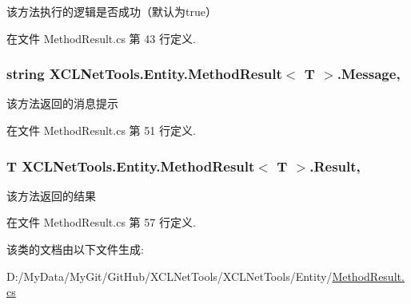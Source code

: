 该方法执行的逻辑是否成功（默认为true） 



在文件 Method\-Result.\-cs 第 43 行定义.

\hypertarget{class_x_c_l_net_tools_1_1_entity_1_1_method_result_3_01_t_01_4_a94580e5529a2d7f2cfce40060475c86d}{
\subsubsection[{Message}]{\setlength{\rightskip}{0pt plus 5cm}string X\-C\-L\-Net\-Tools.\-Entity.\-Method\-Result$<$ T $>$.Message\hspace{0.3cm}{\ttfamily [get]}, {\ttfamily [set]}}}\label{class_x_c_l_net_tools_1_1_entity_1_1_method_result_3_01_t_01_4_a94580e5529a2d7f2cfce40060475c86d}


该方法返回的消息提示 



在文件 Method\-Result.\-cs 第 51 行定义.

\hypertarget{class_x_c_l_net_tools_1_1_entity_1_1_method_result_3_01_t_01_4_a307672c2f6fc11705888fd90eb0cb86c}{
\subsubsection[{Result}]{\setlength{\rightskip}{0pt plus 5cm}T X\-C\-L\-Net\-Tools.\-Entity.\-Method\-Result$<$ T $>$.Result\hspace{0.3cm}{\ttfamily [get]}, {\ttfamily [set]}}}\label{class_x_c_l_net_tools_1_1_entity_1_1_method_result_3_01_t_01_4_a307672c2f6fc11705888fd90eb0cb86c}


该方法返回的结果 



在文件 Method\-Result.\-cs 第 57 行定义.



该类的文档由以下文件生成\-:\begin{DoxyCompactItemize}
\item 
D\-:/\-My\-Data/\-My\-Git/\-Git\-Hub/\-X\-C\-L\-Net\-Tools/\-X\-C\-L\-Net\-Tools/\-Entity/\hyperlink{_method_result_8cs}{Method\-Result.\-cs}\end{DoxyCompactItemize}

